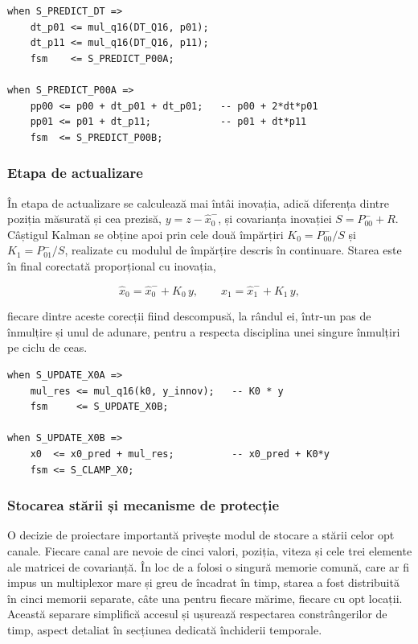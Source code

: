 \begin{lstlisting}[caption={Predicția covarianței, descompusă pe stări.},label={lst:predict-p}]
when S_PREDICT_DT =>
    dt_p01 <= mul_q16(DT_Q16, p01);
    dt_p11 <= mul_q16(DT_Q16, p11);
    fsm    <= S_PREDICT_P00A;

when S_PREDICT_P00A =>
    pp00 <= p00 + dt_p01 + dt_p01;   -- p00 + 2*dt*p01
    pp01 <= p01 + dt_p11;            -- p01 + dt*p11
    fsm  <= S_PREDICT_P00B;
\end{lstlisting}

\subsubsection{Etapa de actualizare}

În etapa de actualizare se calculează mai întâi inovația, adică diferența dintre
poziția măsurată și cea prezisă, $y = z - \hat{x}_0^{-}$, și covarianța inovației
$S = P_{00}^{-} + R$. Câștigul Kalman se obține apoi prin cele două împărțiri
$K_0 = P_{00}^{-}/S$ și $K_1 = P_{01}^{-}/S$, realizate cu modulul de împărțire
descris în continuare. Starea este în final corectată proporțional cu inovația,

\begin{equation*}
\hat{x}_0 = \hat{x}_0^{-} + K_0\,y, \qquad \hat{x}_1 = \hat{x}_1^{-} + K_1\,y,
\end{equation*}

fiecare dintre aceste corecții fiind descompusă, la rândul ei, într-un pas de
înmulțire și unul de adunare, pentru a respecta disciplina unei singure înmulțiri pe
ciclu de ceas.

\begin{lstlisting}[caption={Corecția poziției, separată în înmulțire și adunare.},label={lst:kalman-update}]
when S_UPDATE_X0A =>
    mul_res <= mul_q16(k0, y_innov);   -- K0 * y
    fsm     <= S_UPDATE_X0B;

when S_UPDATE_X0B =>
    x0  <= x0_pred + mul_res;          -- x0_pred + K0*y
    fsm <= S_CLAMP_X0;
\end{lstlisting}

\subsubsection{Stocarea stării și mecanisme de protecție}

O decizie de proiectare importantă privește modul de stocare a stării celor opt
canale. Fiecare canal are nevoie de cinci valori, poziția, viteza și cele trei
elemente ale matricei de covarianță. În loc de a folosi o singură memorie comună,
care ar fi impus un multiplexor mare și greu de încadrat în timp, starea a fost
distribuită în cinci memorii separate, câte una pentru fiecare mărime, fiecare cu
opt locații. Această separare simplifică accesul și ușurează respectarea
constrângerilor de timp, aspect detaliat în secțiunea dedicată închiderii temporale.

